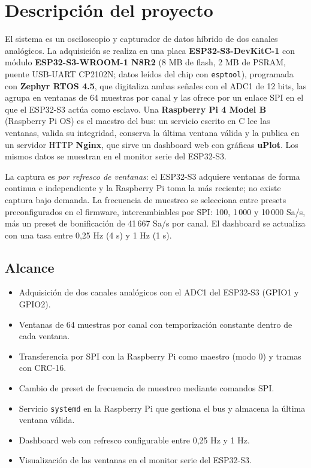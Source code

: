 \documentclass[12pt,a4paper]{article}
\begin{document}

\tableofcontents
\newpage

\section{Descripción del proyecto}

El sistema es un osciloscopio y capturador de datos híbrido de dos canales analógicos. La adquisición se realiza en una placa \textbf{ESP32-S3-DevKitC-1} con módulo \textbf{ESP32-S3-WROOM-1 N8R2} (8 MB de flash, 2 MB de PSRAM, puente USB-UART CP2102N; datos leídos del chip con \texttt{esptool}), programada con \textbf{Zephyr RTOS 4.5}, que digitaliza ambas señales con el ADC1 de 12 bits, las agrupa en ventanas de 64 muestras por canal y las ofrece por un enlace SPI en el que el ESP32-S3 actúa como esclavo. Una \textbf{Raspberry Pi 4 Model B} (Raspberry Pi OS) es el maestro del bus: un servicio escrito en C lee las ventanas, valida su integridad, conserva la última ventana válida y la publica en un servidor HTTP \textbf{Nginx}, que sirve un dashboard web con gráficas \textbf{uPlot}. Los mismos datos se muestran en el monitor serie del ESP32-S3.

La captura es \emph{por refresco de ventanas}: el ESP32-S3 adquiere ventanas de forma continua e independiente y la Raspberry Pi toma la más reciente; no existe captura bajo demanda. La frecuencia de muestreo se selecciona entre presets preconfigurados en el firmware, intercambiables por SPI: 100, 1\,000 y 10\,000 Sa/s, más un preset de bonificación de 41\,667 Sa/s por canal. El dashboard se actualiza con una tasa entre 0{,}25 Hz (4 s) y 1 Hz (1 s).

\subsection{Alcance}

\begin{itemize}
  \item Adquisición de dos canales analógicos con el ADC1 del ESP32-S3 (GPIO1 y GPIO2).
  \item Ventanas de 64 muestras por canal con temporización constante dentro de cada ventana.
  \item Transferencia por SPI con la Raspberry Pi como maestro (modo 0) y tramas con CRC-16.
  \item Cambio de preset de frecuencia de muestreo mediante comandos SPI.
  \item Servicio \texttt{systemd} en la Raspberry Pi que gestiona el bus y almacena la última ventana válida.
  \item Dashboard web con refresco configurable entre 0{,}25 Hz y 1 Hz.
  \item Visualización de las ventanas en el monitor serie del ESP32-S3.
\end{itemize}
\end{document}
